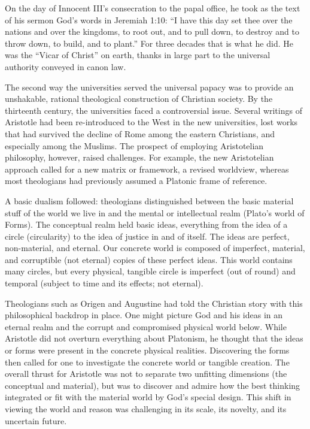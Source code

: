 On the day of Innocent III’s consecration to the papal office, he took as the text of his sermon
God’s words in Jeremiah 1:10: “I have this day set thee over the nations and over the kingdoms, to
root out, and to pull down, to destroy and to throw down, to build, and to plant.” For three decades
that is what he did. He was the “Vicar of Christ” on earth, thanks in large part to the universal
authority conveyed in canon law.

The second way the universities served the universal papacy was to provide an unshakable, rational
theological construction of Christian society. By the thirteenth century, the universities faced a
controversial issue. Several writings of Aristotle had been re-introduced to the West in the new
universities, lost works that had survived the decline of Rome among the eastern Christians, and
especially among the Muslims. The prospect of employing Aristotelian philosophy, however, raised
challenges. For example, the new Aristotelian approach called for a new matrix or framework, a
revised worldview, whereas most theologians had previously assumed a Platonic frame of reference.

A basic dualism followed: theologians distinguished between the basic material stuff of the world we
live in and the mental or intellectual realm (Plato’s world of Forms). The conceptual realm held
basic ideas, everything from the idea of a circle (circularity) to the idea of justice in and of
itself. The ideas are perfect, non-material, and eternal. Our concrete world is composed of
imperfect, material, and corruptible (not eternal) copies of these perfect ideas. This world
contains many circles, but every physical, tangible circle is imperfect (out of round) and temporal
(subject to time and its effects; not eternal).

Theologians such as Origen and Augustine had told the Christian story with this philosophical
backdrop in place. One might picture God and his ideas in an eternal realm and the corrupt and
compromised physical world below. While Aristotle did not overturn everything about Platonism, he
thought that the ideas or forms were present in the concrete physical realities. Discovering the
forms then called for one to investigate the concrete world or tangible creation. The overall thrust
for Aristotle was not to separate two unfitting dimensions (the conceptual and material), but was to
discover and admire how the best thinking integrated or fit with the material world by God’s special
design. This shift in viewing the world and reason was challenging in its scale, its novelty, and
its uncertain future.

